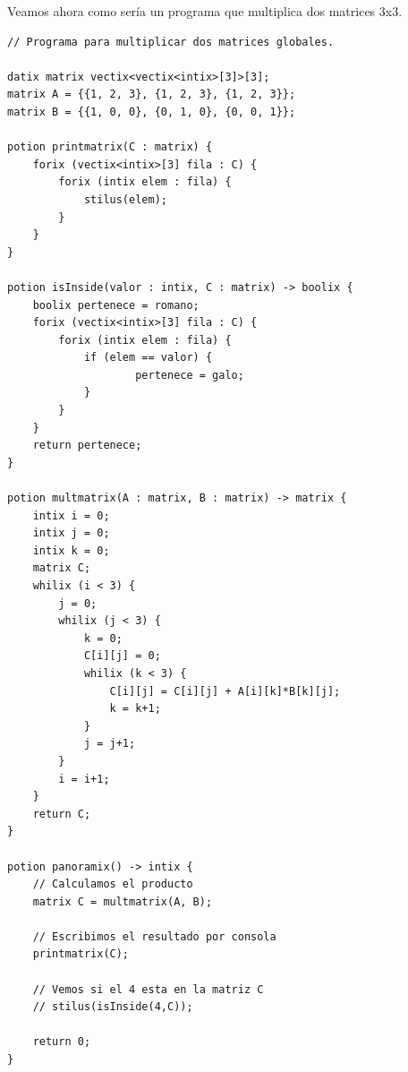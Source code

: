 \documentclass[a4paper, 9pt]{article}
\begin{document}
    Veamos ahora como sería un programa que multiplica dos matrices 3x3.
    \begin{verbatim}
// Programa para multiplicar dos matrices globales.

datix matrix vectix<vectix<intix>[3]>[3];
matrix A = {{1, 2, 3}, {1, 2, 3}, {1, 2, 3}};
matrix B = {{1, 0, 0}, {0, 1, 0}, {0, 0, 1}};

potion printmatrix(C : matrix) {
    forix (vectix<intix>[3] fila : C) {
        forix (intix elem : fila) {
            stilus(elem);
        }
    }
}

potion isInside(valor : intix, C : matrix) -> boolix {
    boolix pertenece = romano; 
    forix (vectix<intix>[3] fila : C) {
        forix (intix elem : fila) {
            if (elem == valor) {
                    pertenece = galo;
            }
        }
    }
    return pertenece;
}

potion multmatrix(A : matrix, B : matrix) -> matrix {
    intix i = 0;
    intix j = 0;
    intix k = 0;
    matrix C;
    whilix (i < 3) {
        j = 0;
        whilix (j < 3) {
            k = 0;
            C[i][j] = 0;
            whilix (k < 3) {
                C[i][j] = C[i][j] + A[i][k]*B[k][j];
                k = k+1;
            }
            j = j+1;
        }
        i = i+1;
    }
    return C;
}

potion panoramix() -> intix {
    // Calculamos el producto
    matrix C = multmatrix(A, B);

    // Escribimos el resultado por consola
    printmatrix(C);

    // Vemos si el 4 esta en la matriz C
    // stilus(isInside(4,C));
    
    return 0;
}
    \end{verbatim}
\end{document}

